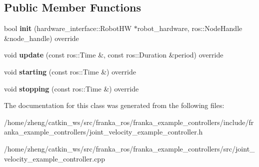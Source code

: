 \subsection*{Public Member Functions}
\begin{DoxyCompactItemize}
\item 
\mbox{\label{classfranka__example__controllers_1_1_joint_velocity_example_controller_a97f6b9f2bd26bdb3700844549a5a803c}} 
bool {\bfseries init} (hardware\+\_\+interface\+::\+Robot\+HW $\ast$robot\+\_\+hardware, ros\+::\+Node\+Handle \&node\+\_\+handle) override
\item 
\mbox{\label{classfranka__example__controllers_1_1_joint_velocity_example_controller_af25c5523cd2f79a7bd2da9cc1a5348d6}} 
void {\bfseries update} (const ros\+::\+Time \&, const ros\+::\+Duration \&period) override
\item 
\mbox{\label{classfranka__example__controllers_1_1_joint_velocity_example_controller_a6f0a4d2a40e3b3fd827de7a882401a35}} 
void {\bfseries starting} (const ros\+::\+Time \&) override
\item 
\mbox{\label{classfranka__example__controllers_1_1_joint_velocity_example_controller_ae7557a0ea289d4d427f393fd5a4866b5}} 
void {\bfseries stopping} (const ros\+::\+Time \&) override
\end{DoxyCompactItemize}


The documentation for this class was generated from the following files\+:\begin{DoxyCompactItemize}
\item 
/home/zheng/catkin\+\_\+ws/src/franka\+\_\+ros/franka\+\_\+example\+\_\+controllers/include/franka\+\_\+example\+\_\+controllers/joint\+\_\+velocity\+\_\+example\+\_\+controller.\+h\item 
/home/zheng/catkin\+\_\+ws/src/franka\+\_\+ros/franka\+\_\+example\+\_\+controllers/src/joint\+\_\+velocity\+\_\+example\+\_\+controller.\+cpp\end{DoxyCompactItemize}
